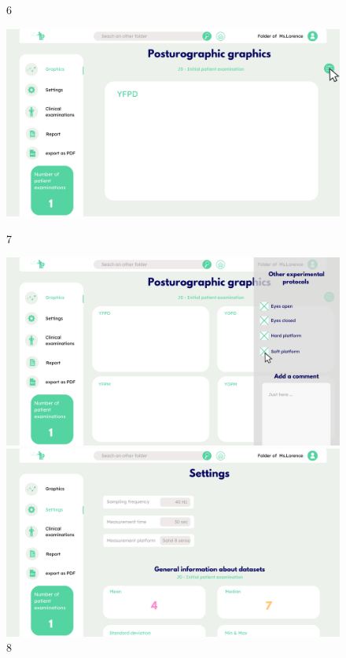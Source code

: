 \begin{figure}[H]
\begin{minipage}{0.3\textwidth}
        \caption*{6}
    \end{minipage}
    \begin{minipage}{0.3\textwidth}
        \centering
        \includegraphics[width=\textwidth]{images/Prototype/7.png}
        \caption*{7}
    \end{minipage}
    \begin{minipage}{0.3\textwidth}
        \centering
        \includegraphics[width=\textwidth]{images/Prototype/Visualisation des données en fonction de différents protocoles expérimentaux.png}
        \caption*{8}
    \end{minipage}
    \begin{minipage}{0.3\textwidth}
        \centering
        \includegraphics[width=\textwidth]{images/Prototype/visualiser des données clés du jeu de données étudié.png}

\end{minipage}
\end{figure}
